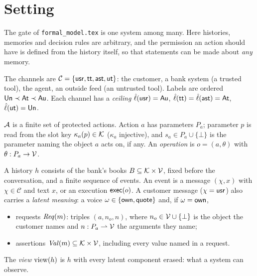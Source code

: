 \section{Setting}\label{sec:setting}

The gate of \texttt{formal\_model.tex} is one system among many. Here histories, memories and
decision rules are arbitrary, and the permission an action should have is defined from the
history itself, so that statements can be made about \emph{any} memory.

\begin{definition}\label{def:channels}
The channels are $\mathcal{C} = \{\mathsf{usr}, \mathsf{tt}, \mathsf{ast}, \mathsf{ut}\}$: the customer, a bank system (a trusted
tool), the agent, an outside feed (an untrusted tool). Labels are ordered
$\mathsf{Un} \prec \mathsf{At} \prec \mathsf{Au}$. Each channel has a \emph{ceiling}
$\hat\ell(\mathsf{usr}) = \mathsf{Au}$, $\hat\ell(\mathsf{tt}) = \hat\ell(\mathsf{ast}) = \mathsf{At}$, $\hat\ell(\mathsf{ut}) = \mathsf{Un}$.
\end{definition}

\begin{definition}
$\mathcal{A}$ is a finite set of protected actions. Action $a$ has parameters $P_a$; parameter $p$ is read
from the slot key $\kappa_a(p) \in \mathcal{K}$ ($\kappa_a$ injective), and $s_a \in P_a \cup \{\bot\}$ is
the parameter naming the object $a$ acts on, if any. An \emph{operation} is $o = (a, \theta)$ with
$\theta : P_a \to \mathcal{V}$.
\end{definition}

\begin{definition}\label{def:history}
A history $h$ consists of the bank's books $B \subseteq \mathcal{K} \times \mathcal{V}$, fixed before the
conversation, and a finite sequence of events. An event is a message $(\chi, x)$ with
$\chi \in \mathcal{C}$ and text $x$, or an execution $\mathsf{exec}(o)$. A customer message ($\chi = \mathsf{usr}$)
also carries a \emph{latent meaning}: a voice $\omega \in \{\mathsf{own}, \mathsf{quote}\}$ and, if $\omega = \mathsf{own}$,
\begin{itemize}
\item requests $\mathit{Req}(m)$: triples $(a, n_o, n)$, where $n_o \in \mathcal{V} \cup \{\bot\}$ is the object the
  customer names and $n : P_a \rightharpoonup \mathcal{V}$ the arguments they name;
\item assertions $\mathit{Val}(m) \subseteq \mathcal{K} \times \mathcal{V}$, including every value named in a request.
\end{itemize}
The \emph{view} $\mathrm{view}(h)$ is $h$ with every latent component erased: what a system can observe.
\end{definition}

